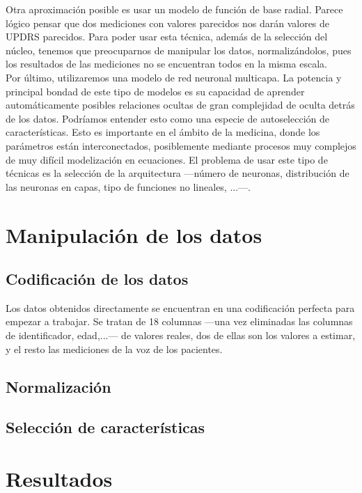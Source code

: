 Otra aproximación posible es usar un modelo de función de base radial. Parece lógico pensar que dos mediciones con valores parecidos nos darán valores de UPDRS parecidos. Para poder usar esta técnica, además de la selección del núcleo, tenemos que preocuparnos de manipular los datos, normalizándolos, pues los resultados de las mediciones no se encuentran todos en la misma escala.\\

Por último, utilizaremos una modelo de red neuronal multicapa. La potencia y principal bondad de este tipo de modelos es su capacidad de aprender automáticamente posibles relaciones ocultas de gran complejidad de oculta detrás de los datos. Podríamos entender esto como una especie de autoselección de características. Esto es importante en el ámbito de la medicina, donde los parámetros están interconectados, posiblemente mediante procesos muy complejos de muy difícil modelización en ecuaciones. El problema de usar este tipo de técnicas es la selección de la arquitectura ---número de neuronas, distribución de las neuronas en capas, tipo de funciones no lineales, ...---.\\


\section{Manipulación de los datos}

\subsection{Codificación de los datos}

Los datos obtenidos directamente se encuentran en una codificación perfecta para empezar a trabajar. Se tratan de 18 columnas ---una vez eliminadas las columnas de identificador, edad,...--- de valores reales, dos de ellas son los valores a estimar, y el resto las mediciones de la voz de los pacientes.\\

\subsection{Normalización}
\subsection{Selección de características}
\section{Resultados}
